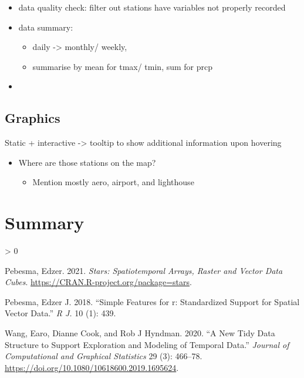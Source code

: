 \documentclass{article}
\newlength{\cslhangindent}
\newenvironment{CSLReferences}[2] %
 {%
  \setlength{\parindent}{0pt}
  \ifodd #1 \everypar{\setlength{\hangindent}{\cslhangindent}}\ignorespaces\fi
  \ifnum #2 > 0
  \setlength{\parskip}{#2\baselineskip}
  \fi
 }%
 {}
\begin{document}
\begin{itemize}
\tightlist
\item
  data quality check: filter out stations have variables not properly
  recorded
\item
  data summary:

  \begin{itemize}
  \tightlist
  \item
    daily -\textgreater{} monthly/ weekly,
  \item
    summarise by mean for tmax/ tmin, sum for prcp
  \end{itemize}
\item
\end{itemize}

\hypertarget{graphics}{%
\subsection{Graphics}\label{graphics}}

Static + interactive -\textgreater{} tooltip to show additional
information upon hovering

\begin{itemize}
\tightlist
\item
  Where are those stations on the map?

  \begin{itemize}
  \tightlist
  \item
    Mention mostly aero, airport, and lighthouse
  \end{itemize}
\end{itemize}

\hypertarget{summary}{%
\section*{Summary}\label{summary}}

\hypertarget{refs}{}
\begin{CSLReferences}{1}{0}
\leavevmode\hypertarget{ref-stars}{}%
Pebesma, Edzer. 2021. \emph{Stars: Spatiotemporal Arrays, Raster and
Vector Data Cubes}. \url{https://CRAN.R-project.org/package=stars}.

\leavevmode\hypertarget{ref-pebesma2018simple}{}%
Pebesma, Edzer J. 2018. {``Simple Features for r: Standardized Support
for Spatial Vector Data.''} \emph{R J.} 10 (1): 439.

\leavevmode\hypertarget{ref-tsibbles}{}%
Wang, Earo, Dianne Cook, and Rob J Hyndman. 2020. {``A New Tidy Data
Structure to Support Exploration and Modeling of Temporal Data.''}
\emph{Journal of Computational and Graphical Statistics} 29 (3):
466--78. \url{https://doi.org/10.1080/10618600.2019.1695624}.

\end{CSLReferences}



\end{document}
